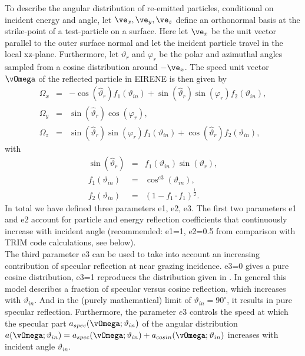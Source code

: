 To describe the angular distribution of re-emitted particles, conditional
on incident energy and angle,  let
$ \ve_x ,   \ve_y ,   \ve_z$ define
an orthonormal basis at the strike-point of a test-particle on a
surface. Here let $ \ve_x$ be the unit vector parallel
to the outer surface normal and let the incident particle travel
in the local xz-plane. Furthermore, let $ \vartheta_r$ and $
\varphi_r$ be the polar and azimuthal angles sampled from a cosine
distribution around $ - \ve_x$. The speed unit vector $
\vOmega $ of the reflected particle in EIRENE is then
given by
\begin{eqnarray}
\Omega_x   & = &  - \cos( \hat{\vartheta}_r ) f_1 ( \vartheta_{in}
)   +   \sin( \hat{\vartheta}_r )
\sin( \varphi_r)   f_2 ( \vartheta_{in} )     ,   \nonumber\\
\Omega_y   & = &  \sin( \hat{\vartheta}_r )
\cos( \varphi_r )     ,                           \nonumber\\
\Omega_z   & = &  \sin( \hat{\vartheta}_r ) \sin( \varphi_r )
f_1( \vartheta_{in} )   + \cos( \hat{\vartheta}_r )   f_2(
\vartheta_{in} )  , \label{eq1.21}
\end{eqnarray}
with
\begin{eqnarray}
\sin( \hat{\vartheta}_r )   & = &  f_1( \vartheta
_{in})   \sin( \vartheta_r )     , \nonumber\\
 f_1( \vartheta_{in} )   & = &  \cos^{e3} ( \vartheta_{in} ) ,
\nonumber\\
 f_2( \vartheta_{in} ) &  =  &
(   1   -   f_1  \cdot f_1 )^{\frac{1}{2}} . \nonumber
\end{eqnarray}
In total we have defined three parameters e1, e2, e3. The first
two parameters e1 and e2 account for particle and energy
reflection coefficients that continuously increase with incident
angle (recommended: e1=1, e2=0.5 from comparison with TRIM code
calculations, see below).
\\ The third parameter e3 can be used to take into
account an increasing contribution of specular reflection at near
grazing incidence. e3=0 gives a pure cosine distribution, e3=1
reproduces the distribution given in \cite{kn:Heifetz}. In general
this model describes a fraction of specular versus cosine
reflection, which increases with $ \vartheta_{in}$. And in the
(purely mathematical) limit of $ \vartheta_{in}   =   90^{\circ}$,
it results in pure specular reflection. Furthermore, the parameter $e3$ controls
the speed at which the specular part $a_{spec} (
\vOmega; \vartheta_{in})$ of the angular distribution $a
(\vOmega; \vartheta_{in})   =   a_{spec} ( \vOmega; \vartheta_{in})
  +   a_{cosin} ( \vOmega; \vartheta_{in})$ increases with incident angle
$ \vartheta_{in} $.

